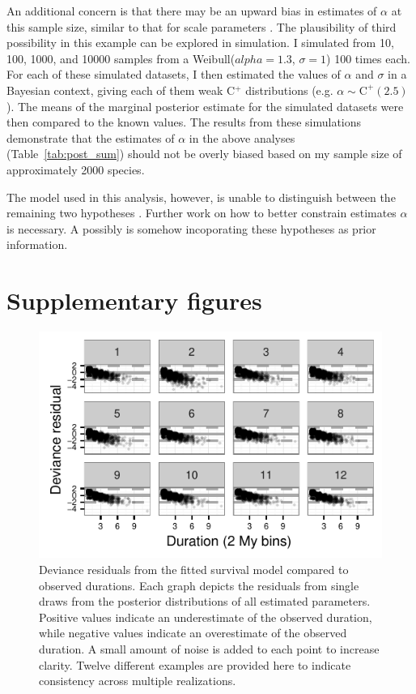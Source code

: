 \documentclass{article}
\begin{document}
An additional concern is that there may be an upward bias in estimates of $\alpha$ at this sample size, similar to that for scale parameters \cite{Gelman2013d}. The plausibility of third possibility in this example can be explored in simulation. I simulated from 10, 100, 1000, and 10000 samples from a Weibull(\(alpha = 1.3\), \(\sigma = 1\)) 100 times each. For each of these simulated datasets, I then estimated the values of \(\alpha\) and \(\sigma\) in a Bayesian context, giving each of them weak C\(^{+}\) distributions (e.g. \(\alpha \sim \mathrm{C}^{+}(2.5)\)). The means of the marginal posterior estimate for the simulated datasets were then compared to the known values. The results from these simulations demonstrate that the estimates of \(\alpha\) in the above analyses (Table~\ref{tab:post_sum}) should not be overly biased based on my sample size of approximately 2000 species. 

The model used in this analysis, however, is unable to distinguish between the remaining two hypotheses \cite{Sepkoski1975,Wagner2014b}. Further work on how to better constrain estimates $\alpha$ is necessary. A possibly is somehow incoporating these hypotheses as prior information.

\clearpage

\section{Supplementary figures}

\begin{figure}[ht]
  \centering
  \includegraphics[height = 0.5\textheight, width = \textwidth, keepaspectratio = true]{figure/residual_plot}
  \caption{Deviance residuals from the fitted survival model compared to observed durations. Each graph depicts the residuals from single draws from the posterior distributions of all estimated parameters. Positive values indicate an underestimate of the observed duration, while negative values indicate an overestimate of the observed duration. A small amount of noise is added to each point to increase clarity. Twelve different examples are provided here to indicate consistency across multiple realizations.}
  \label{fig:ppc_res}
\end{figure}
\end{document}
